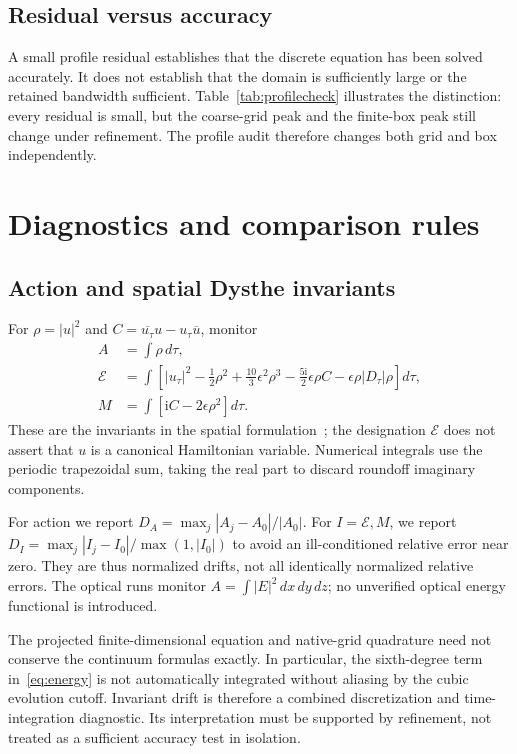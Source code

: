 \documentclass[10pt,letterpaper]{article}
\numberwithin{equation}{section}
\newcommand{\ii}{\mathrm{i}}
\begin{document}
\subsection{Residual versus accuracy}
A small profile residual establishes that the discrete equation has been solved accurately. It does not establish that the domain is sufficiently large or the retained bandwidth sufficient. Table~\ref{tab:profilecheck} illustrates the distinction: every residual is small, but the coarse-grid peak and the finite-box peak still change under refinement. The profile audit therefore changes both grid and box independently.

\section{Diagnostics and comparison rules}
\subsection{Action and spatial Dysthe invariants}
For $\rho=|u|^2$ and $C=\overline{u_\tau}u-u_\tau\overline u$, monitor
\begin{align}
 A&=\int\rho\,d\tau,\\
 \mathcal E&=\int\left[|u_\tau|^2-\tfrac12\rho^2
       +\tfrac{10}{3}\epsilon^2\rho^3
       -\tfrac{5\ii}{2}\epsilon\rho C
       -\epsilon\rho|D_\tau|\rho\right]d\tau,\label{eq:energy}\\
 M&=\int\left[\ii C-2\epsilon\rho^2\right]d\tau.
\end{align}
These are the invariants in the spatial formulation~\cite{FD}; the designation $\mathcal E$ does not assert that $u$ is a canonical Hamiltonian variable. Numerical integrals use the periodic trapezoidal sum, taking the real part to discard roundoff imaginary components.

For action we report $D_A=\max_j|A_j-A_0|/|A_0|$. For $I=\mathcal E,M$, we report $D_I=\max_j|I_j-I_0|/\max(1,|I_0|)$ to avoid an ill-conditioned relative error near zero. They are thus normalized drifts, not all identically normalized relative errors. The optical runs monitor $A=\int|E|^2\,dx\,dy\,dz$; no unverified optical energy functional is introduced.

The projected finite-dimensional equation and native-grid quadrature need not conserve the continuum formulas exactly. In particular, the sixth-degree term in~\eqref{eq:energy} is not automatically integrated without aliasing by the cubic evolution cutoff. Invariant drift is therefore a combined discretization and time-integration diagnostic. Its interpretation must be supported by refinement, not treated as a sufficient accuracy test in isolation.
\end{document}
